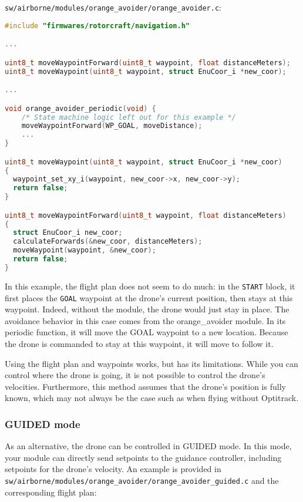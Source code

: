 \documentclass{article}
\begin{document}
\texttt{sw/airborne/modules/orange\_avoider/orange\_avoider.c}:
\begin{lstlisting}[language=c]
#include "firmwares/rotorcraft/navigation.h"

...

uint8_t moveWaypointForward(uint8_t waypoint, float distanceMeters);
uint8_t moveWaypoint(uint8_t waypoint, struct EnuCoor_i *new_coor);

...

void orange_avoider_periodic(void) {
	/* State machine logic left out for this example */
	moveWaypointForward(WP_GOAL, moveDistance);
	...
}

uint8_t moveWaypoint(uint8_t waypoint, struct EnuCoor_i *new_coor)
{
  waypoint_set_xy_i(waypoint, new_coor->x, new_coor->y);
  return false;
}

uint8_t moveWaypointForward(uint8_t waypoint, float distanceMeters)
{
  struct EnuCoor_i new_coor;
  calculateForwards(&new_coor, distanceMeters);
  moveWaypoint(waypoint, &new_coor);
  return false;
}
\end{lstlisting}

In this example, the flight plan does not seem to do much: in the \texttt{START} block, it first places the \texttt{GOAL} waypoint at the drone's current position, then stays at this waypoint. Indeed, without the module, the drone would just stay in place. The avoidance behavior in this case comes from the orange\_avoider module. In its periodic function, it will move the GOAL waypoint to a new location. Because the drone is commanded to stay at this waypoint, it will move to follow it.

Using the flight plan and waypoints works, but has its limitations. While you can control where the drone is going, it is not possible to control the drone's velocities. Furthermore, this method assumes that the drone's position is fully known, which may not always be the case such as when flying without Optitrack.

\subsubsection{GUIDED mode}
As an alternative, the drone can be controlled in GUIDED mode. In this mode, your module can directly send setpoints to the guidance controller, including setpoints for the drone's velocity. An example is provided in \texttt{sw/airborne/modules/orange\_avoider/orange\_avoider\_guided.c} and the corresponding flight plan:
\end{document}

